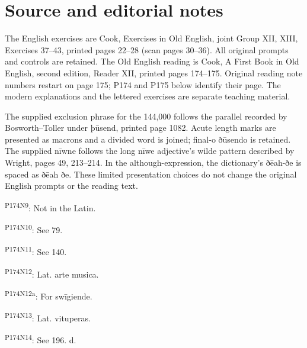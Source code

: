 
\section*{Source and editorial notes}

\begingroup\fontsize{10}{12.8}\selectfont
\setlength{\parskip}{1.5pt}
The English exercises are Cook, Exercises in Old English, joint Group XII, XIII, Exercises 37–43, printed pages 22–28 (scan pages 30–36). All original prompts and controls are retained. The Old English reading is Cook, A First Book in Old English, second edition, Reader XII, printed pages 174–175. Original reading note numbers restart on page 175; P174 and P175 below identify their page. The modern explanations and the lettered exercises are separate teaching material.

The supplied exclusion phrase for the 144,000 follows the parallel recorded by Bosworth–Toller under þūsend, printed page 1082. Acute length marks are presented as macrons and a divided word is joined; final-o ðūsendo is retained. The supplied nīwne follows the long nīwe adjective’s wilde pattern described by Wright, pages 49, 213–214. In the although-expression, the dictionary’s ðēah-ðe is spaced as ðēah ðe. These limited presentation choices do not change the original English prompts or the reading text.

\textsuperscript{P174N9}: Not in the Latin.

\textsuperscript{P174N10}: See 79.

\textsuperscript{P174N11}: See 140.

\textsuperscript{P174N12}: Lat. arte musica.

\textsuperscript{P174N12a}: For swīgiende.

\textsuperscript{P174N13}: Lat. vituperas.

\textsuperscript{P174N14}: See 196. d.

